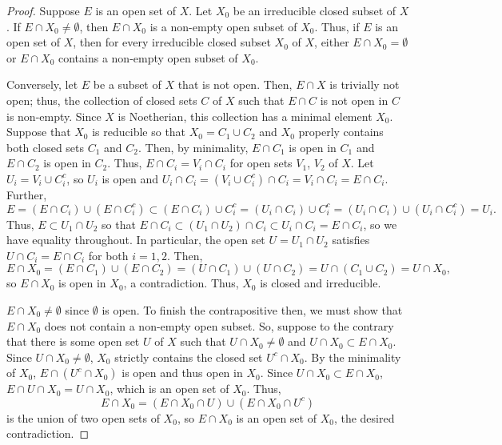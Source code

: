 \begin{proof}
Suppose $E$ is an open set of $X$. Let $X_0$ be an irreducible closed subset of $X$. If $E \cap X_0 \neq \emptyset$, then $E \cap X_0$ is
a non-empty open subset of $X_0$. Thus, if $E$ is an open set of $X$, then for every irreducible closed subset $X_0$ of $X$,
either $E \cap X_0 = \emptyset$ or $E \cap X_0$ contains a non-empty open subset of $X_0$.

Conversely, let $E$ be a subset of $X$ that is not open. Then, $E \cap X$ is trivially not open; thus, the collection of closed sets $C$ of $X$
such that $E \cap C$ is not open in $C$ is non-empty. Since $X$ is Noetherian, this collection has a minimal element $X_0$. Suppose that $X_0$ is 
reducible so that $X_0 = C_1 \cup C_2$ and $X_0$ properly contains both closed sets $C_1$ and $C_2$. Then, by minimality, $E \cap C_1$ is open in 
$C_1$ and $E \cap C_2$ is open in $C_2$. Thus, $E \cap C_i = V_i \cap C_i$ for open sets $V_1$, $V_2$ of $X$. Let $U_i = V_i \cup C_i^c$, so $U_i$
is open and $U_i \cap C_i = (V_i \cup C_i^c) \cap C_i = V_i \cap C_i = E \cap C_i$. Further, 
$$E = (E \cap C_i) \cup (E \cap C_i^c) \subset (E \cap C_i) \cup C_i^c = (U_i \cap C_i) \cup C_i^c = (U_i \cap C_i) \cup (U_i \cap C_i^c) = U_i.$$
Thus, $E \subset U_1 \cap U_2$ so that $E \cap C_i \subset (U_1 \cap U_2) \cap C_i \subset U_i \cap C_i = E \cap C_i$, so we have equality throughout.
In particular, the open set $U = U_1 \cap U_2$ satisfies $U \cap C_i = E \cap C_i$ for both $i=1,2$. Then, 
$$E \cap X_0 = (E \cap C_1) \cup (E \cap C_2) = (U \cap C_1) \cup (U \cap C_2) = U \cap (C_1 \cup C_2) = U \cap X_0,$$
so $E \cap X_0$ is open in $X_0$, a contradiction. Thus, $X_0$ is closed and irreducible.

$E \cap X_0 \neq \emptyset$ since $\emptyset$ is open. To finish the contrapositive then, we must show that $E \cap X_0$ does not contain a non-empty open
subset. So, suppose to the contrary that there is some open set $U$ of $X$ such that $U \cap X_0 \neq \emptyset$ and $U \cap X_0 \subset E \cap X_0$.
Since $U \cap X_0 \neq \emptyset$, $X_0$ strictly contains the closed set $U^c \cap X_0$. By the minimality of $X_0$, $E \cap (U^c \cap X_0)$ is open
and thus open in $X_0$. Since $U \cap X_0 \subset E \cap X_0$, $E \cap U \cap X_0 = U \cap X_0$, which is an open set of $X_0$. Thus,
$$E \cap X_0 = (E \cap X_0 \cap U) \cup (E \cap X_0 \cap U^c)$$
is the union of two open sets of $X_0$, so $E \cap X_0$ is an open set of $X_0$, the desired contradiction.
\end{proof}

